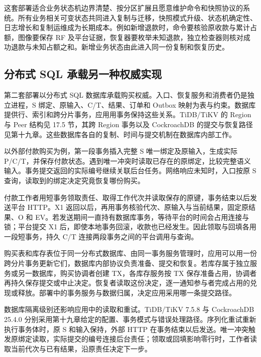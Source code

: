 这套部署适合业务状态机边界清楚、按分区扩展且愿意维护命令和快照协议的系统。所有业务相关可变状态共同进入复制与迁移，快照模式升级、状态机确定性、日志增长和复制运维成为长期成本。例如新增退款时，命令要核验原收款与累计占额，图像要保存 RF 及平台证据，恢复器要枚举未知退款，独立检查器则核对成功退款与未知占额之和。新增业务状态由此进入同一份复制和恢复历史。

\subsection{分布式 SQL 承载另一种权威实现}

第二套部署以分布式 SQL 数据库承载购买权威。入口、恢复服务和消费者仍是独立进程，S 绑定、原输入、C/T、结果、订单和 Outbox 映射为表与约束。数据库提供行、索引和跨分片事务，应用用事务保持这些关系。TiDB/TiKV 的 Region 与 Peer 结构见 17.5 节，其跨 Region 事务以及 CockroachDB 的提交与恢复路径见第十九章。这些数据库各自的复制、时间与提交机制在数据库内部工作。


以外部付款购买为例，第一段事务插入完整 S 唯一绑定及原输入，生成实际 P/C/T，并保存付款状态。遇到唯一冲突时读取已存在的原绑定，比较完整语义输入。事务提交返回的实际编号继续关联后台任务。网络响应未知时，入口按原 S 查询，读取到的绑定决定究竟恢复哪份购买。

付款工作者用短事务领取责任、取得工作代次并读取保存的原键，事务结束以后发送平台 HTTP。X1 返回以后，再用事务核验代次、原输入与当前结果，固定原结果、O 和 EV。若发送期间一直持有数据库事务，等待平台的时间会占用连接与锁；平台提交 X1 后，即使本地事务回滚，收款也已经发生。因此领取与回填各用一段短事务，持久 C/T 连接两段事务之间的平台调用与查询。

购买表和库存表位于同一分布式数据库、由同一事务服务管理时，应用可以用一份跨分片事务更新它们，数据库内部协议负责准备、提交和恢复。若库存属于独立服务或另一数据库，购买协调者创建 TX，各库存服务按 TX 保存准备占用，协调者再持久保存提交或中止决定。恢复者读取这份决定，逐一通知参与者完成占用的兑现或释放。部署中的事务服务与数据归属，决定应用采用哪一条提交路径。

数据库隔离级别还影响应用中的读取和重试。TiDB/TiKV 7.5.8 与 CockroachDB 25.4.0 分别采用第十九章给定的配置、事务模式与错误处理路径。序列化重试重新执行事务体时，原 S 和输入保持，外部 HTTP 在事务结束以后发送。唯一冲突触发原绑定读取，实际提交的编号连接后台责任；领取或回填影响零行时，工作者读取当前代次与已有结果，沿原责任决定下一步。

